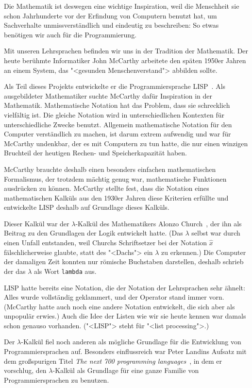 Die Mathematik ist deswegen eine wichtige Inspiration, weil die
Menschheit sie schon Jahrhunderte vor der Erfindung von Computern
benutzt hat, um Sachverhalte unmissverständlich und eindeutig zu
beschreiben: So etwas benötigen wir auch für die Programmierung.

Mit unseren Lehrsprachen befinden wir uns in der Tradition der
Mathematik.  Der heute berühmte Informatiker John McCarthy arbeitete
den späten 1950er Jahren an einem System, das "<gesunden
Menschenverstand"> abbilden sollte.

Als Teil dieses Projekts entwickelte er die Programmiersprache
LISP~\cite{McCarthy1960}.  Als ausgebildeter Mathematiker suchte
McCarthy dafür Inspiration in der Mathematik.  Mathematische Notation
hat das Problem, dass sie schrecklich vielfältig ist.  Die gleiche
Notation wird in unterschiedlichen Kontexten für unterschiedliche
Zwecke benutzt.  Allgemein mathematische Notation für den Computer
verständlich zu machen, ist darum extrem aufwendig und war für
McCarthy undenkbar, der es mit Computern zu tun hatte, die nur einen
winzigen Bruchteil der heutigen Rechen- und Speicherkapazität haben.

McCarthy brauchte deshalb einen besonders einfachen mathematischen
Formalismus, der trotzdem mächtig genug war, mathematische Funktionen
ausdrücken zu können.  McCarthy stellte fest, dass die Notation eines
mathematischen Kalküls aus den 1930er Jahren diese Kriterien erfüllte
und entwickelte LISP deshalb auf Grundlage dieses Kalküls.

Dieser Kalkül war der $\lambda$-Kalkül des Mathematikers Alonzo
Church~\cite{Church1941}, der ihn als Beitrag zu den Grundlagen der
Logik entwickelt hatte.  (Das $\lambda$ selbst war durch einen Unfall
entstanden, weil Churchs Schriftsetzer bei der Notation $\hat{x}$
fälschlicherweise glaubte, statt des "<Dachs"> ein $\lambda$ zu
erkennen.)  Die Computer der damaligen Zeit konnten nur römische
Buchstaben darstellen, deshalb schrieb der das $\lambda$ als Wort
\lstinline{lambda} aus.

LISP hatte bereits eine Notation, die der Notation der Lehrsprachen
sehr ähnelt: Alles wurde vollständig geklammert, und der Operator
stand immer vorn.  (McCarthy hatte auch noch eine andere Notation
entwickelt, die sich aber als unpopulär erwies.)  Auch die Idee der
Listen wie wir sie heute kennen war damals schon genauso vorhanden.
("<LISP"> steht für "<list processing">.)

Der $\lambda$-Kalkül fiel noch anderen als mögliche Grundlage für die
Entwicklung von Programmiersprachen auf.  Besonders einflussreich war
Peter Landins Aufsatz mit dem großspurigen Titel \textit{The next 700
  programming languages}~\cite{Landin1966}, in dem er vorschlug, den
$\lambda$-Kalkül als Grundlage für eine ganze Familie von
Programmiersprachen zu benutzen.

